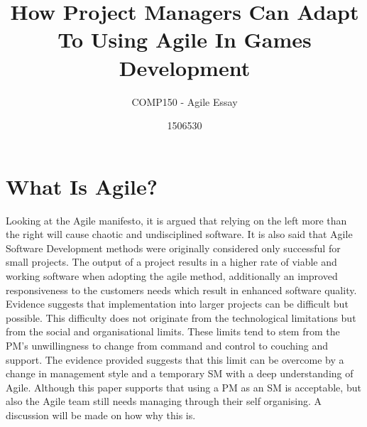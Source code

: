\documentclass{scrartcl}
\title{How Project Managers Can Adapt To Using Agile In Games Development}
\subtitle{COMP150 - Agile Essay}
\author{1506530}
\begin{document}
\maketitle


\section{What Is Agile?}
 
Looking at the Agile manifesto, it is argued that relying on the left more than the right will cause chaotic and undisciplined software\cite{ready,Chaos}. It is also said that Agile Software Development methods were originally considered only successful for small projects\cite{ready,manifesto,extreme}. The output of a project results in a higher rate of viable and working software when adopting the agile method, additionally an improved responsiveness to the customers needs which result in enhanced software quality\cite{LeaderUnleashed,MasterActivities}. Evidence suggests that implementation into larger projects can be difficult but possible\cite{MasterActivities}. This difficulty does not originate from the technological limitations but from the social and organisational limits\cite{SocialAgile}. These limits tend to stem from the PM's unwillingness to change from command and control to couching and support. The evidence provided suggests that this limit can be overcome by a change in management style and a temporary SM with a deep understanding of Agile\cite{Together}. Although this paper supports that using a PM as an SM is acceptable, but also the Agile team still needs managing through their self organising. A discussion will be made on how why this is. 
\end{document}
